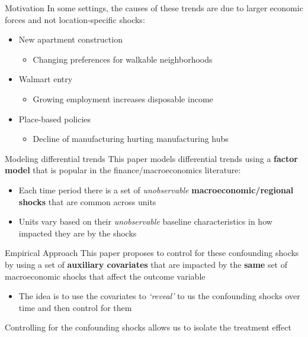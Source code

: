\documentclass[aspectratio=169,t,11pt,table]{beamer}
\begin{document}
\begin{frame}{Motivation}
  In some settings, the causes of these trends are due to larger economic forces and not location-specific shocks:
  
  \begin{itemize}
    \item New apartment construction
    \begin{itemize}
      \item Changing preferences for walkable neighborhoods
    \end{itemize} 

    \pause
    \item Walmart entry
    \begin{itemize}
      \item Growing employment increases disposable income
    \end{itemize}

    \pause
    \item Place-based policies
    \begin{itemize}
      \item Decline of manufacturing hurting manufacturing hubs
    \end{itemize}
  \end{itemize}
\end{frame}

\begin{frame}{Modeling differential trends}
  This paper models differential trends using a \textbf{factor model} that is popular in the finance/macroeconomics literature:

  \begin{itemize}
    \item Each time period there is a set of \emph{unobservable} \textbf{macroeconomic/regional shocks} that are common across units
    \item Units vary based on their \emph{unobservable} baseline characteristics in how impacted they are by the shocks
  \end{itemize} 
\end{frame}

\begin{frame}{Empirical Approach}
  This paper proposes to control for these confounding shocks by using a set of \textbf{auxiliary covariates} that are impacted by the \textbf{same} set of macroeconomic shocks that affect the outcome variable

  \begin{itemize}
    \item The idea is to use the covariates to \emph{`reveal'} to us the confounding shocks over time and then control for them 
  \end{itemize}

  \bigskip
  Controlling for the confounding shocks allows us to isolate the treatment effect
\end{frame}
\end{document}
